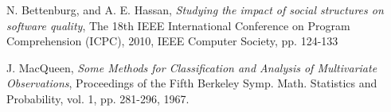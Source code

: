 \documentclass[conference]{IEEEtran}
\begin{document}
\begin{thebibliography}{2}
N. Bettenburg, and A. E. Hassan, \emph{Studying the impact of social structures on software quality}, The 18th IEEE International Conference on Program Comprehension (ICPC), 2010, IEEE Computer Society, pp. 124-133




J. MacQueen, \emph{Some Methods for Classification and Analysis of Multivariate Observations}, Proceedings of the Fifth Berkeley Symp. Math. Statistics and Probability, vol. 1, pp. 281-296, 1967. 


\end{thebibliography}




\end{document}
